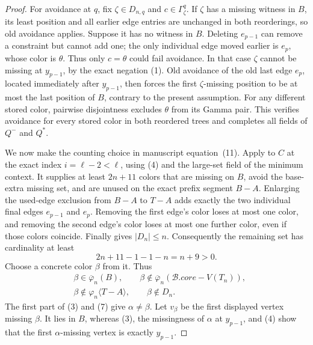 \begin{proof}
For avoidance at \(q\), fix \(\zeta\in D_{n,q}\) and
\(c\in\Gamma^q_\zeta\).  If \(\zeta\) has a missing witness in \(B\),
its least position and all earlier edge entries are unchanged in both
reorderings, so old avoidance applies.  Suppose it has no witness in
\(B\).  Deleting \(e_{p-1}\) can remove a constraint but cannot add one;
the only individual edge moved earlier is \(e_p\), whose color is
\(\theta\).  Thus only \(c=\theta\) could fail avoidance.  In that case
\(\zeta\) cannot be missing at \(y_{p-1}\), by the exact negation (1).
Old avoidance of the old last edge \(e_p\), located immediately after
\(y_{p-1}\), then forces the first \(\zeta\)-missing position to be at
most the last position of \(B\), contrary to the present assumption.
For any different stored color, pairwise disjointness excludes \(\theta\)
from its Gamma pair.  This verifies avoidance for every stored color in
both reordered trees and completes all fields of \(Q^-\) and \(Q^*\).

We now make the counting choice in manuscript equation~(11).  Apply
 to \(C\) at the exact index \(i=\ell-2<\ell\), using
(4) and the large-set field of the minimum context.  It supplies at least
\(2n+11\) colors that are missing on \(B\), avoid the base-extra missing
set, and are unused on the exact prefix segment \(B-A\).  Enlarging the
used-edge exclusion from \(B-A\) to \(T-A\) adds exactly the two
individual final edges \(e_{p-1}\) and \(e_p\).  Removing the first
edge's color loses at most one color, and removing the second edge's color
loses at most one further color, even if those colors coincide.  Finally
 gives \(|D_n|\le n\).
Consequently the remaining set has cardinality at least
\[
                    2n+11-1-1-n=n+9>0.                      \tag{6}
\]
Choose a concrete color \(\beta\) from it.  Thus
\[
 \begin{aligned}
 &\beta\in\overline\varphi_n(B),\qquad
 \beta\notin\overline\varphi_n
      (\mathcal B.\mathit{core}-V(T_n)),\\
 &\beta\notin\varphi_n\langle T-A\rangle,\qquad
 \beta\notin D_n.                                          \tag{7}
 \end{aligned}
\]
The first part of (3) and (7) give \(\alpha\ne\beta\).  Let
\(v_\beta\) be the first displayed vertex missing \(\beta\).  It lies in
\(B\), whereas (3), the missingness of \(\alpha\) at \(y_{p-1}\), and
(4) show that the first \(\alpha\)-missing vertex is exactly
\(y_{p-1}\).


\end{proof}
